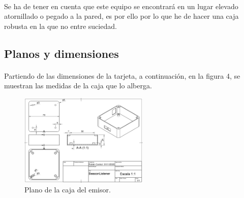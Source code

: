 \documentclass[paper=a4, fontsize=11pt,twoside]{scrartcl}
\begin{document}
        \paragraph{}
        Se ha de tener en cuenta que este equipo se encontrará en un lugar elevado atornillado o pegado a la pared, 
        es por ello por lo que he de hacer una caja robusta en la que no entre suciedad. 
    \subsection{Planos y dimensiones}
        \paragraph{}
        Partiendo de las dimensiones de la tarjeta, a continuación, en la figura 4, se
        muestran las medidas de la caja que lo alberga. 
        \begin{center}
            \begin{figure}[h]
                \centering
                \includegraphics[width=0.55\textwidth]{../model_master.PNG}
                \caption{Plano de la caja del emisor.}
                \label{fig:mesh1}
            \end{figure}
        \end{center}
        \paragraph{}
        \paragraph{}
\end{document}
